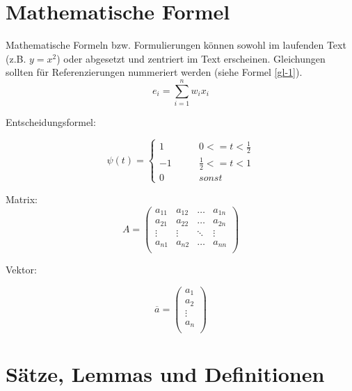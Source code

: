 \section{Mathematische Formel}
Mathematische Formeln bzw. Formulierungen können sowohl im laufenden Text (z.B. $y=x^2$) oder abgesetzt und zentriert im Text erscheinen. Gleichungen sollten für Referenzierungen nummeriert werden (siehe Formel \ref{gl-1}).
\begin{equation}\label{gl-1}
	e_{i}=\sum _{i=1}^{n}w_{i}x_{i}
\end{equation}

Entscheidungsformel:

\begin{equation}
	\psi(t)=\left\{
	\begin{array}{ccc}
		1 &  \qquad 0 <= t < \frac{1}{2} \\
		-1 &  \qquad \frac{1}{2} <= t <1 \\
		0 & \qquad sonst
	\end{array} \right.
\end{equation}


Matrix:
\begin{equation}
	A = \left(
	\begin{array}{llll}
		a_{11} & a_{12} & \ldots & a_{1n} \\
		a_{21} & a_{22} & \ldots & a_{2n} \\
		\vdots & \vdots & \ddots & \vdots \\
		a_{n1} & a_{n2} & \ldots & a_{nn} \\
	\end{array}
	\right)
\end{equation}

Vektor: 

\begin{equation}
	\overline{a} = \left(
	\begin{array}{c}
		a_{1}\\
		a_{2}\\
		\vdots\\
		a_{n}\\
	\end{array}
	\right)
\end{equation}

\section{Sätze, Lemmas und Definitionen}

